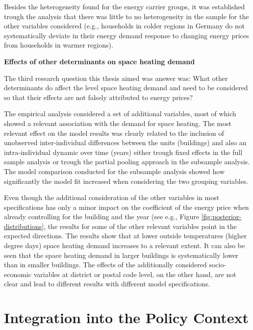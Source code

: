 \documentclass[12pt,twoside]{reedthesis}
\begin{document}
Besides the heterogeneity found for the energy carrier groups, it was established trough the analysis that there was little to no heterogeneity in the sample for the other variables considered (e.g., households in colder regions in Germany do not systematically deviate in their energy demand response to changing energy prices from households in warmer regions).

\textbf{Effects of other determinants on space heating demand}

The third research question this thesis aimed was answer was: What other determinants do affect the level space heating demand and need to be considered so that their effects are not falsely attributed to energy prices?

The empirical analysis considered a set of additional variables, most of which showed a relevant association with the demand for space heating. The most relevant effect on the model results was clearly related to the inclusion of unobserved inter-individual differences between the units (buildings) and also an intra-individual dynamic over time (years) either trough fixed effects in the full sample analysis or trough the partial pooling approach in the subsample analysis. The model comparison conducted for the subsample analysis showed how significantly the model fit increased when considering the two grouping variables.

Even though the additional consideration of the other variables in most specifications has only a minor impact on the coefficient of the energy price when already controlling for the building and the year (see e.g., Figure \ref{fig:posterior-distributions}, the results for some of the other relevant variables point in the expected directions. The results show that at lower outside temperatures (higher degree days) space heating demand increases to a relevant extent. It can also be seen that the space heating demand in larger buildings is systematically lower than in smaller buildings. The effects of the additionally considered socio-economic variables at district or postal code level, on the other hand, are not clear and lead to different results with different model specifications.

\hypertarget{policy-context}{%
\section{Integration into the Policy Context}\label{policy-context}}
\end{document}
